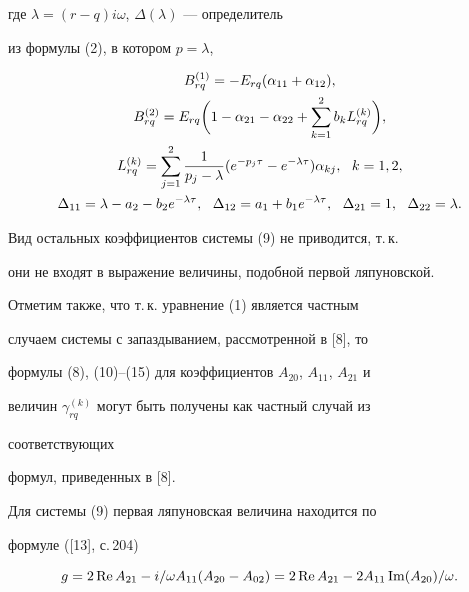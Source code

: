 где $\lambda=(r-q)i\omega$, $\Delta(\lambda)$ --- определитель 


из формулы (2), в котором $p=\lambda$, 


\begin{gather} 


B^{(1)}_{rq}=-E_{rq}(\alpha_{11}+\alpha_{12}),\notag \\ 


% 


B^{(2)}_{rq}=E_{rq}\bigg(1-\alpha_{21}-\alpha_{22} 


+\sum^2_{k=1}b_k L^{(k)}_{rq}\bigg), \\ 


L^{(k)}_{rq}=\sum^2_{j=1}\frac{1}{p_j-\lambda} 


(e^{-p_j\tau}-e^{-\lambda\tau})\alpha_{kj},\ \ k=1,2,\notag \\ 


% 


\Delta_{11}=\lambda-a_2-b_2e^{-\lambda\tau},\ \ 


\Delta_{12}=a_1+b_1e^{-\lambda\tau},\ \ 


\Delta_{21}=1, \ \ \Delta_{22}=\lambda. 


\end{gather} 


Вид остальных коэффициентов системы (9) не приводится, т.\,к. 


они не входят в выражение величины, подобной первой ляпуновской. 


 


Отметим также, что т.\,к. уравнение (1) является частным 


случаем системы с запаздыванием, рассмотренной в [8], то 


формулы (8), (10)--(15) для коэффициентов $A_{20}$, $A_{11}$, $A_{21}$ и 


величин $\gamma^{(k)}_{rq}$ могут быть получены как частный случай из 


соответствующих 


формул, приведенных в [8]. 


 


Для системы (9) первая ляпуновская величина находится по 


формуле ([13], с.\,204) 


\begin{equation} 


g=2\re A_{21}-i/\omega A_{11}(A_{20}-A_{02})= 


2\re A_{21}-2A_{11}\im(A_{20})/\omega. 


\end{equation} 


